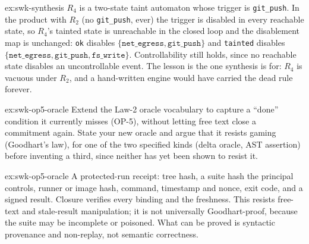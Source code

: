 \documentclass[11pt,a4paper]{article}
\theoremstyle{definition}
\theoremstyle{remark}
\begin{document}
\begin{pdsolution}{ex:swk-synthesis}
$R_4$ is a two-state taint automaton whose trigger is \texttt{git\_push}. In the product with $R_2$ (no \texttt{git\_push}, ever) the trigger is disabled in every reachable state, so $R_4$'s tainted state is unreachable in the closed loop and the disablement map is unchanged: \texttt{ok} disables $\{\texttt{net\_egress}, \texttt{git\_push}\}$ and \texttt{tainted} disables $\{\texttt{net\_egress}, \texttt{git\_push}, \texttt{fs\_write}\}$. Controllability still holds, since no reachable state disables an uncontrollable event. The lesson is the one synthesis is for: $R_4$ is vacuous under $R_2$, and a hand-written engine would have carried the dead rule forever.
\end{pdsolution}
\begin{pdexercise}[kind=Open,rating=3]{ex:swk-op5-oracle}
Extend the Law-2 oracle vocabulary to capture a ``done'' condition it currently misses (OP-5), without letting free text close a commitment again. State your new oracle and argue that it resists gaming (Goodhart's law), for one of the two specified kinds (delta oracle, AST assertion) before inventing a third, since neither has yet been shown to resist it.
\end{pdexercise}
\begin{pdsolution}{ex:swk-op5-oracle}
A protected-run receipt: tree hash, a suite hash the principal controls, runner or image hash, command, timestamp and nonce, exit code, and a signed result. Closure verifies every binding and the freshness. This resists free-text and stale-result manipulation; it is not universally Goodhart-proof, because the suite may be incomplete or poisoned. What can be proved is syntactic provenance and non-replay, not semantic correctness.
\end{pdsolution}


\end{document}
